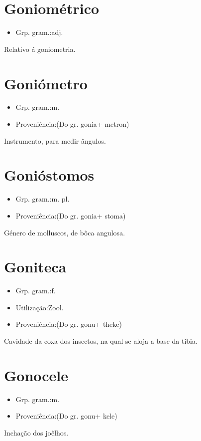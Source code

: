 \section{Goniométrico}
\begin{itemize}
\item {Grp. gram.:adj.}
\end{itemize}
Relativo á goniometria.
\section{Goniómetro}
\begin{itemize}
\item {Grp. gram.:m.}
\end{itemize}
\begin{itemize}
\item {Proveniência:(Do gr. \textunderscore gonia\textunderscore  + \textunderscore metron\textunderscore )}
\end{itemize}
Instrumento, para medir ângulos.
\section{Gonióstomos}
\begin{itemize}
\item {Grp. gram.:m. pl.}
\end{itemize}
\begin{itemize}
\item {Proveniência:(Do gr. \textunderscore gonia\textunderscore  + \textunderscore stoma\textunderscore )}
\end{itemize}
Género de molluscos, de bôca angulosa.
\section{Goniteca}
\begin{itemize}
\item {Grp. gram.:f.}
\end{itemize}
\begin{itemize}
\item {Utilização:Zool.}
\end{itemize}
\begin{itemize}
\item {Proveniência:(Do gr. \textunderscore gonu\textunderscore  + \textunderscore theke\textunderscore )}
\end{itemize}
Cavidade da coxa dos insectos, na qual se aloja a base da tibia.
\section{Gonocele}
\begin{itemize}
\item {Grp. gram.:m.}
\end{itemize}
\begin{itemize}
\item {Proveniência:(Do gr. \textunderscore gonu\textunderscore  + \textunderscore kele\textunderscore )}
\end{itemize}
Inchação dos joêlhos.
